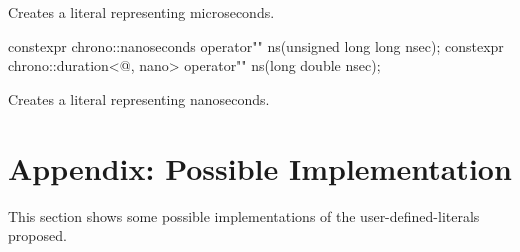\documentclass[ebook,11pt,article]{memoir}
\begin{document}
\begin{itemdescr}
\pnum
\effects
Creates a  literal representing  microseconds. 
\end{itemdescr}

\begin{itemdecl}
constexpr 
chrono::nanoseconds operator"" ns(unsigned long long nsec);
constexpr 
chrono::duration<@\unspec@, nano> operator"" ns(long double nsec);
\end{itemdecl}

\begin{itemdescr}
\pnum
\effects
Creates a  literal representing  nanoseconds. 
\end{itemdescr}

\newpage
\chapter{Appendix: Possible Implementation}
This section shows some possible implementations of the user-defined-literals proposed.
\end{document}
